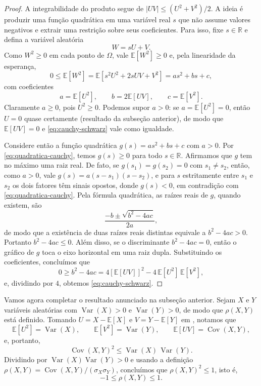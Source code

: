 \documentclass[12pt,portuguese]{article}
\theoremstyle{definition}
\theoremstyle{plainexercise}
\theoremstyle{starredexercise}
\theoremstyle{definition}
\begin{document}
\begin{proof}
A integrabilidade do produto segue de
$|UV|\leqslant(U^2+V^2)/2$.
A ideia é produzir uma função quadrática em uma variável real $s$ que não
assume valores negativos e extrair uma restrição sobre seus coeficientes.
Para isso, fixe $s\in\mathbb{R}$ e defina a variável aleatória
\[
  W = sU + V.
\]
Como $W^2 \geqslant 0$ em cada ponto de $\Omega$, vale $\mathbb{E}[W^2]
\geqslant 0$ e, pela linearidade da esperança,
\begin{equation}\label{eq:quadratica-cauchy}
  0
  \leqslant \mathbb{E}[W^2]
  = \mathbb{E}[s^2U^2 + 2sUV + V^2]
  = as^2 + bs + c,
\end{equation}
com coeficientes
\[
  a = \mathbb{E}[U^2],
  \qquad b = 2\mathbb{E}[UV],
  \qquad c = \mathbb{E}[V^2].
\]
Claramente $a \geqslant 0$, pois $U^2 \geqslant 0$. Podemos supor $a > 0$: se
$a = \mathbb{E}[U^2] = 0$, então $U = 0$ quase certamente (resultado da
subseção anterior), de modo que $\mathbb{E}[UV] = 0$ e
\eqref{eq:cauchy-schwarz} vale como igualdade.

Considere então a função quadrática $g(s) = as^2 + bs + c$ com $a > 0$. Por
\eqref{eq:quadratica-cauchy}, temos $g(s) \geqslant 0$ para todo
$s\in\mathbb{R}$. Afirmamos que $g$ tem no máximo uma raiz real. De fato, se
$g(s_1) = g(s_2) = 0$ com $s_1 \neq s_2$, então, como $a > 0$, vale
$g(s) = a(s - s_1)(s - s_2)$, e para $s$ estritamente entre $s_1$ e $s_2$ os
dois fatores têm sinais opostos, donde $g(s) < 0$, em contradição com
\eqref{eq:quadratica-cauchy}. 
Pela fórmula quadrática, as raízes reais de $g$, quando existem, são
\[
\frac{-b \pm \sqrt{b^2 - 4ac}}{2a},
\]
de modo que a existência de duas raízes
reais distintas equivale a $b^2 - 4ac > 0$. Portanto $b^2 - 4ac \leqslant 0$.
Além disso, se o discriminante $b^2 - 4ac = 0$, então o gráfico de $g$ toca o eixo horizontal
em uma raiz dupla. Substituindo os coeficientes, concluímos que
\[
  0
  \geqslant b^2 - 4ac
  = 4[\mathbb{E}[UV]]^2 - 4\,\mathbb{E}[U^2]\,\mathbb{E}[V^2],
\]
e, dividindo por $4$, obtemos \eqref{eq:cauchy-schwarz}.
\end{proof}

Vamos agora completar o resultado anunciado na subseção anterior. Sejam $X$ e
$Y$ variáveis aleatórias com $\operatorname{Var}(X) > 0$ e
$\operatorname{Var}(Y) > 0$, de modo que $\rho(X,Y)$ está definido. Tomando
$U = X - \mathbb{E}[X]$ e $V = Y - \mathbb{E}[Y]$ em
, notamos que
\[
  \mathbb{E}[U^2] = \operatorname{Var}(X),
  \qquad
  \mathbb{E}[V^2] = \operatorname{Var}(Y),
  \qquad
  \mathbb{E}[UV] = \operatorname{Cov}(X,Y),
\]
e, portanto,
\[
  \operatorname{Cov}(X,Y)^2
  \leqslant
  \operatorname{Var}(X)\,\operatorname{Var}(Y).
\]
Dividindo por $\operatorname{Var}(X)\operatorname{Var}(Y) > 0$ e usando a
definição $\rho(X,Y) = \operatorname{Cov}(X,Y)/(\sigma_X\sigma_Y)$,
concluímos que $\rho(X,Y)^2 \leqslant 1$, isto é,
\[
  -1 \leqslant \rho(X,Y) \leqslant 1.
\]
\end{document}
